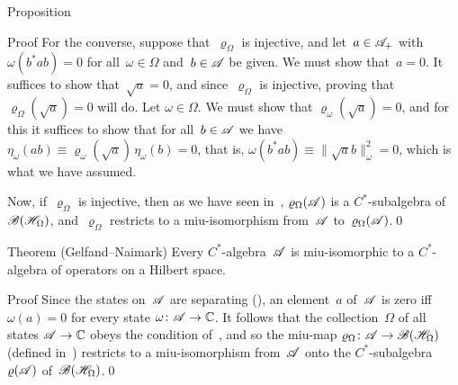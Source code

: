 \documentclass[a]{subfiles}
\begin{document}
\begin{parsec}
\begin{point}{Proposition}
\begin{point}{Proof}
For the converse, suppose that~$\varrho_\Omega$ is injective,
and let~$a\in\mathscr{A}_+$ with $\omega(b^*ab)=0$
for all~$\omega\in\Omega$ and~$b\in\mathscr{A}$ be given.
We must show that~$a=0$.
It suffices to show that~$\sqrt{a}=0$,
and since~$\varrho_\Omega$ is injective,
proving that~$\varrho_\Omega(\sqrt{a})=0$ will do.
Let $\omega\in\Omega$. We must show that
$\varrho_\omega(\sqrt{a})=0$,
and for this it suffices to show that
for all~$b\in \mathscr{A}$ we have
$\eta_\omega(ab)\equiv\varrho_\omega(\sqrt{a})\,\eta_\omega(b)=0$,
that is, $\omega(b^*ab)\equiv\|\sqrt{a}b\|_\omega^2=0$,
which is what we have assumed.

Now, if~$\varrho_\Omega$ is injective,
then as we have seen in~,
$\varrho_\Omega(\mathscr{A})$ is a $C^*$-subalgebra
of~$\mathscr{B}(\mathscr{H}_\Omega)$,
and~$\varrho_\Omega$ restricts to a miu-isomorphism
from~$\mathscr{A}$ to~$\varrho_\Omega(\mathscr{A})$.\qed
\end{point}
\end{point}
\begin{point}{Theorem (Gelfand--Naimark)}%
Every $C^*$-algebra~$\mathscr{A}$ is miu-isomorphic
to a $C^*$-algebra of operators on a Hilbert space.
\begin{point}{Proof}%
Since the states on~$\mathscr{A}$
are separating
(),
an element~$a$ of~$\mathscr{A}$ is zero
iff $\omega(a)=0$ for every state $\omega\colon \mathscr{A}\to\mathbb{C}$.
It follows that the collection~$\Omega$ of all states $\mathscr{A}\to \mathbb{C}$
obeys the condition of~,
and so
the miu-map $\varrho_\Omega\colon \mathscr{A}\to\mathscr{B}(\mathscr{H}_\Omega)$
(defined in~)
restricts to a miu-isomorphism
from~$\mathscr{A}$ onto the $C^*$-subalgebra
$\varrho(\mathscr{A})$ of~$\mathscr{B}(\mathscr{H}_\Omega)$.\qed
\end{point}
\end{point}
\end{parsec}
\end{document}
